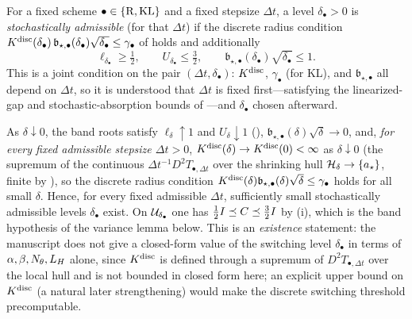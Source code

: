 \begin{definition}
\label{def:stoch-admissible}
For a fixed scheme $\bullet\in\{\mathrm{R},\mathrm{KL}\}$ and a fixed stepsize $\Delta t$, a level $\delta_\bullet>0$
is \emph{stochastically admissible} (for that $\Delta t$) if the discrete radius condition
$K^{\mathrm{disc}}(\delta_\bullet)\,\mathfrak b_{\star,\bullet}(\delta_\bullet)\sqrt{\delta_\bullet}\leq\gamma_\bullet$
of  holds and additionally
\[
    \ell_{\delta_\bullet}\geq\tfrac12,\qquad U_{\delta_\bullet}\leq\tfrac32,\qquad
    \mathfrak b_{\star,\bullet}(\delta_\bullet)\sqrt{\delta_\bullet}\leq1 .
\]
This is a joint condition on the pair $(\Delta t,\delta_\bullet)$: $K^{\mathrm{disc}}$, $\gamma_\bullet$ (for KL),
and $\mathfrak b_{\star,\bullet}$ all depend on $\Delta t$, so it is understood that $\Delta t$ is fixed
first---satisfying the linearized-gap and stochastic-absorption bounds of
---and $\delta_\bullet$ chosen afterward.
\end{definition}

\begin{remark}[Existence]
\label{rem:stoch-admissible-exists}
As $\delta\downarrow0$, the band roots satisfy $\ell_\delta\uparrow1$ and $U_\delta\downarrow1$
(), $\mathfrak b_{\star,\bullet}(\delta)\sqrt\delta\to0$, and, \emph{for every fixed
admissible stepsize $\Delta t>0$}, $K^{\mathrm{disc}}(\delta)\to K^{\mathrm{disc}}(0)<\infty$ as $\delta\downarrow0$ (the
supremum of the continuous $\Delta t^{-1}D^2T_{\bullet,\Delta t}$ over the shrinking hull
$\mathcal{H}_\delta\to\{a_\star\}$, finite by ), so the discrete radius condition
$K^{\mathrm{disc}}(\delta)\mathfrak b_{\star,\bullet}(\delta)\sqrt\delta\leq\gamma_\bullet$ holds for all small
$\delta$. Hence, for every fixed admissible $\Delta t$, sufficiently small stochastically admissible
levels $\delta_\bullet$ exist. On $\mathcal{U}_{\delta_\bullet}$ one has
$\tfrac12I\preceq C\preceq\tfrac32I$ by (i), which is the band hypothesis of the
variance lemma below. This is an \emph{existence} statement: the manuscript does not give a
closed-form value of the switching level $\delta_\bullet$ in terms of $\alpha,\beta,N_\theta,L_H$
alone, since $K^{\mathrm{disc}}$ is defined through a supremum of $D^2T_{\bullet,\Delta t}$ over the local hull
and is not bounded in closed form here; an explicit upper bound on $K^{\mathrm{disc}}$ (a natural later
strengthening) would make the discrete switching threshold precomputable.
\end{remark}

